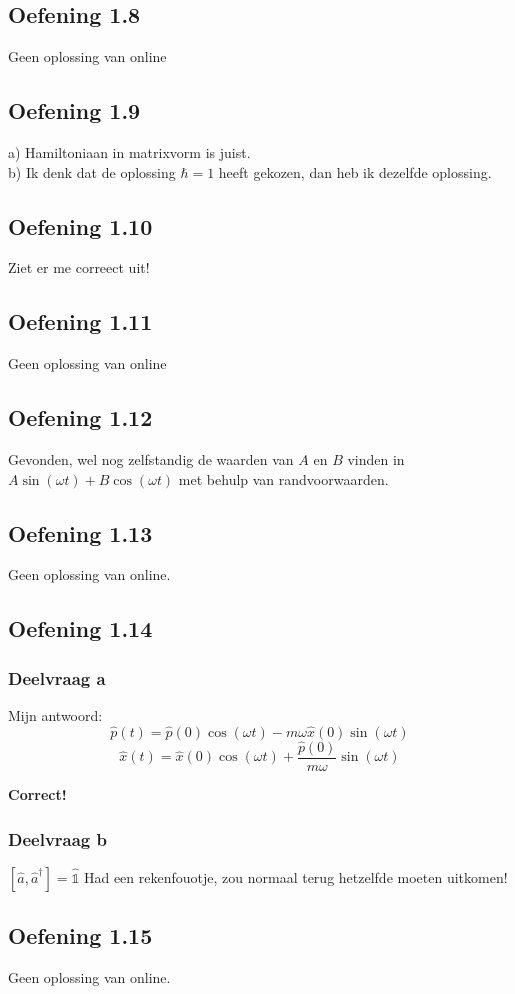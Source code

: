\documentclass[a4paper,twoside]{article}
\theoremstyle{definition}
\theoremstyle{plain}
\begin{document}
\subsection{Oefening 1.8}
Geen oplossing van online
\subsection{Oefening 1.9}
a) Hamiltoniaan in matrixvorm is juist.\\
b) Ik denk dat de oplossing \(  \hbar = 1\) heeft gekozen, dan heb ik dezelfde oplossing.\\
\subsection{Oefening 1.10}
Ziet er me correect uit!
\subsection{Oefening 1.11}
Geen oplossing van online
\subsection{Oefening 1.12}
Gevonden, wel nog zelfstandig de waarden van \(A\) en \(B\) vinden in \(A\sin(\omega t) + B\cos(\omega t)\) met behulp van randvoorwaarden.
\subsection{Oefening 1.13}
Geen oplossing van online.
\subsection{Oefening 1.14}
\subsubsection{Deelvraag a}
Mijn antwoord:
\[
\hat{p}(t) = \hat{p}(0)\cos(\omega t) - m \omega  \hat{x}(0) \sin(\omega t)
\]
\[
\hat{x}(t) = \hat{x}(0)\cos(\omega t) + \frac{\hat{p}(0)}{m \omega} \sin(\omega t)
\]

\textbf{Correct!}
\subsubsection{Deelvraag b}
\([\hat a , \hat{a}^\dagger] = \hat{\mathds{1}}\)
Had een rekenfouotje, zou normaal terug hetzelfde moeten uitkomen!
\subsection{Oefening 1.15}
Geen oplossing van online.
\end{document}
